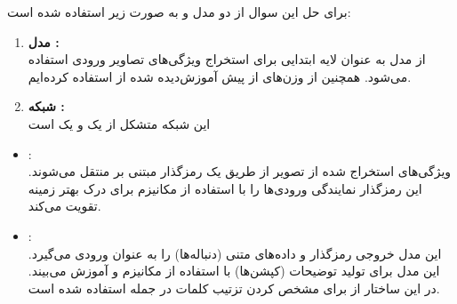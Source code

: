 \begin{qsolve}
برای حل این سوال از دو مدل  و  به صورت زیر استفاده شده است:

	\begin{enumerate}
		\item \textbf{مدل :}\\
از مدل  به عنوان لایه ابتدایی برای استخراج ویژگی‌های تصاویر ورودی استفاده می‌شود. همچنین از وزن‌های از پیش آموزش‌دیده شده از  استفاده کرده‌ایم.


		\item \textbf{شبکه :}\\
		این شبکه متشکل از یک  و یک  است
	\end{enumerate}
\end{qsolve}



\begin{qsolve}
	\begin{itemize}
		\item {}:\\
		ویژگی‌های استخراج شده از تصویر از طریق یک رمزگذار مبتنی بر  منتقل می‌شوند. این رمزگذار نمایندگی ورودی‌ها را با استفاده از مکانیزم‌  برای درک بهتر زمینه تقویت می‌کند.
		
		\item {}:\\
		این مدل خروجی رمزگذار و داده‌های متنی (دنباله‌ها) را به عنوان ورودی می‌گیرد. این مدل برای تولید توضیحات (کپشن‌ها) با استفاده از مکانیزم‌  و  آموزش می‌بیند. در این ساختار از  برای مشخص کردن تزتیب کلمات در جمله استفاده شده است.
	\end{itemize}
\end{qsolve}